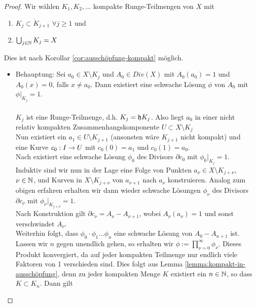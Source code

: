 \begin{proof}
  Wir wählen $K_1, K_2, \dots$ kompakte Runge-Teilmengen von $X$ mit
  \begin{enumerate}
  \item $K_j \subset \mathring{K}_{j+1}$ $\forall j \geq 1$ und
  \item $\bigcup_{j \in \mathbb{N}} K_j = X$
  \end{enumerate}
  Dies ist nach Korollar \ref{cor:ausschöpfung-kompakt} möglich.
  \begin{itemize}
  \item Behauptung: Sei $a_0 \in X \setminus K_j$ und $A_0 \in Div(X)$
    mit $A_0(a_0) = 1$ und $A_0(x) = 0$, falls $x \neq a_0$. Dann
    existiert eine schwache Lösung $\phi$ von $A_0$ mit $\phi |_{K_j}
    = 1$. \\
    \\
    $K_j$ ist eine Runge-Teilmenge, d.h. $K_j = \mathfrak{h}{K_j}$. Also
    liegt $a_0$ in einer nicht relativ kompakten
    Zusammenhangskomponente $U \subset X \setminus K_j$ \\
    Nun existiert ein $a_1 \in U \setminus K_{j+1}$ (ansonsten wäre
    $K_{j+1}$ nicht kompakt) und eine Kurve $c_0: I \rightarrow U$ mit
    $c_0(0)=a_1$ und $c_0(1) = a_0$. \\
    Nach \cite[Lemma 20.5]{For} existiert eine schwache Lösung $\phi_0$ des Divisors
    $\partial c_0$ mit $\phi_0|_{K_j} = 1$. \\
    Induktiv sind wir nun in der Lage eine Folge von Punkten $a_\nu \in
    X \setminus K_{j+ \nu}$, $\nu \in \mathbb{N}$, und Kurven in $X \setminus
    K_{j+\nu}$ von $a_{\nu+1}$ nach $a_\nu$ konstruieren. Analog zum
    obigen erfahren erhalten wir dann wieder schwache Lösungen
    $\phi_\nu$ des Divisors $\partial c_\nu$ mit $\phi_\nu |_{K_{j+\nu}}
    = 1$. \\
    Nach Konstruktion gilt $\partial c_\nu = A_\nu - A_{\nu+1}$, wobei
    $A_\nu(a_\nu) = 1$ und sonst verschwindet $A_\nu$. \\
    Weiterhin folgt, dass $\phi_0 \cdot \phi_1 \dots \phi_n$ eine
    schwache Lösung von $A_0 - A_{n+1}$ ist.
    Lassen wir $n$ gegen unendlich gehen, so erhalten wir $\phi :=
    \prod_{\nu = 0}^\infty \phi_\nu$. Dieses Produkt konvergiert, da
    auf jeder kompakten Teilmenge nur endlich viele Faktoren von 1
    verschieden sind. Dies folgt aus Lemma
    \ref{lemma:kompakt-in-ausschöpfung}, denn zu jeder kompakten Menge
    $K$ existiert ein $n \in \mathbb{N}$, so dass $K \subset K_n$. Dann gilt

\end{itemize}
\end{proof}
